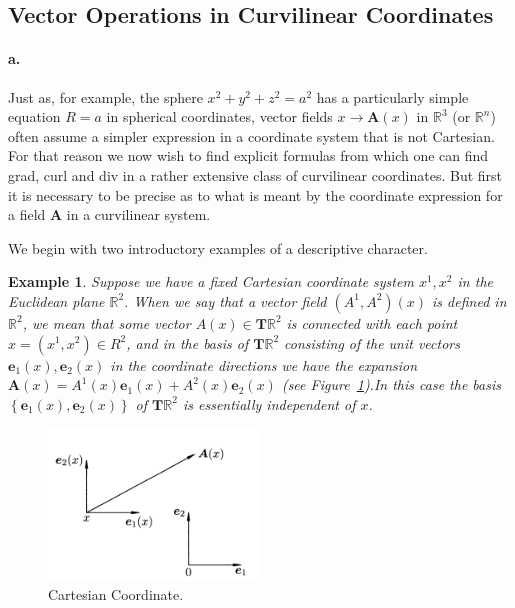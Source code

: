 \documentclass[a4paper,12pt]{article}
\newtheorem{example}{Example}             %
\begin{document}
\begin{CJK}{UTF8}{gbsn}
\section{Vector Operations in Curvilinear Coordinates}

    \paragraph{\textbf{a.}} Just as, for example, the sphere $x^2 + y^2 + z^2 = a^2$ has a 
    particularly simple equation $R = a$ in spherical coordinates,
    vector fields $x \to \bm{A}(x)$ in $\mathbb{R}^3$ (or $\mathbb{R}^n$)
    often assume a simpler expression in a coordinate system that 
    is not Cartesian. For that reason we now wish to find explicit 
    formulas from which one can find grad, curl and div in a rather 
    extensive class of curvilinear coordinates. But first it is 
    necessary to be precise as to what is meant by the coordinate 
    expression for a field $\bm{A}$ in a curvilinear system.

    We begin with two introductory examples of a descriptive 
    character.

    \begin{example}
        Suppose we have a fixed Cartesian coordinate system 
        $x^1, x^2$ in the Euclidean plane $\mathbb{R}^2$. When we say 
        that a vector field $(A^1, A^2)(x)$ is defined in $\mathbb{R}^2$,
        we mean that some vector $A(x) \in \bm{T}\mathbb{R}^2 $ is 
        connected with each point $x = (x^1, x^2) \in R^2$, and in the 
        basis of $\bm{T}\mathbb{R}^2$ consisting of the unit vectors 
        $\bm{e}_1(x), \bm{e}_2(x)$ in the coordinate directions we have 
        the expansion $\bm{A}(x) = A^1(x)\bm{e}_1(x) + A^2(x)\bm{e}_2(x)$
        (see Figure~\ref{fig:fig1}).In this case the basis 
        $\left\{ \bm{e}_1(x), \bm{e}_2(x)\right\}$ of $\bm{T}\mathbb{R}^2$
        is essentially independent of $x$.
    \end{example}
    \graphicspath{
        {./Figs/}
    }
    \begin{figure}[htbp]
    \centering
    \includegraphics[width=0.5\textwidth]{vector_base1.png}
    \caption{Cartesian Coordinate.}
    \label{fig:fig1}
    \end{figure}


\end{CJK}
\end{document}
